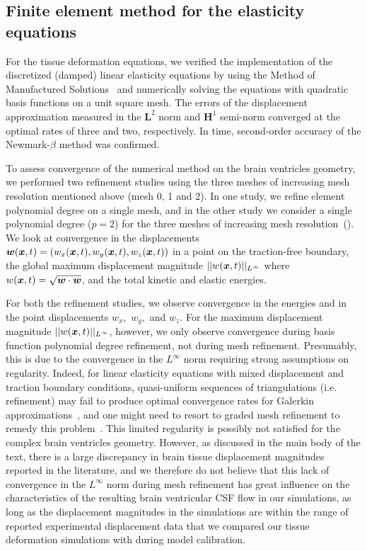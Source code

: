 \documentclass{template}
\begin{document}
\subsection{Finite element method for the elasticity equations}\label{sec:tissue_model_verification}
For the tissue deformation equations, we verified the implementation of the
discretized (damped) linear elasticity equations by using the Method of Manufactured Solutions~\citep{Roache2001CodeSolutions}
and numerically solving the equations with quadratic basis functions on a unit square mesh.
The errors of the displacement approximation measured in the $\bm{L}^2$ norm and
$\bm{H}^1$ semi-norm converged at the optimal rates of three
and two, respectively. In time, second-order accuracy of the 
Newmark-$\beta$ method was confirmed.

To assess convergence of the numerical method on the brain ventricles geometry,
we performed two refinement studies using the three meshes of increasing
mesh resolution mentioned above (mesh 0, 1 and 2). 
In one study, we refine element polynomial degree on a single mesh,
and in the other study we consider a single polynomial degree ($p=2$) for the three 
meshes of increasing mesh resolution~().
We look at convergence in the displacements
$\bm{w}(\bm{x}, t) = (w_x(\bm{x}, t), w_y(\bm{x}, t), w_z(\bm{x}, t))$
in a point on the traction-free boundary,
the global maximum displacement magnitude $||w(\bm{x}, t)||_{L^{\infty}}$
where $w(\bm{x}, t) = \sqrt{\bm{w}\cdot\bm{w}}$, and the total kinetic and elastic energies.

For both the refinement studies, we observe convergence in the energies and in the
point displacements $w_x,$ $w_y,$ and $w_z.$
For the maximum displacement magnitude $||w(\bm{x}, t)||_{L^{\infty}}$, however,
we only observe convergence during basis function polynomial degree refinement,
not during mesh refinement. Presumably, this is due to the convergence
in the $L^{\infty}$ norm requiring strong assumptions on regularity.
Indeed, for linear elasticity equations with 
mixed displacement and traction boundary conditions, quasi-uniform sequences of
triangulations (i.e. refinement) may fail to produce optimal convergence rates
for Galerkin approximations~\citep{mazzucato2010well, wahlbin1984sharpness}, and
one might need to resort to graded mesh refinement to remedy this problem~\citep{apel1998finite}.
This limited regularity is possibly not satisfied for the complex brain
ventricles geometry. However, as discussed in the main body of the text,
there is a large discrepancy in brain tissue displacement magnitudes 
reported in the literature, and we therefore do not believe that this lack of
convergence in the $L^{\infty}$ norm during mesh refinement 
has great influence on the characteristics of the resulting
brain ventricular CSF flow in our simulations, as long as the displacement
magnitudes in the simulations are within the range of reported experimental
displacement data that we compared our tissue deformation simulations with
during model calibration.
\end{document}
